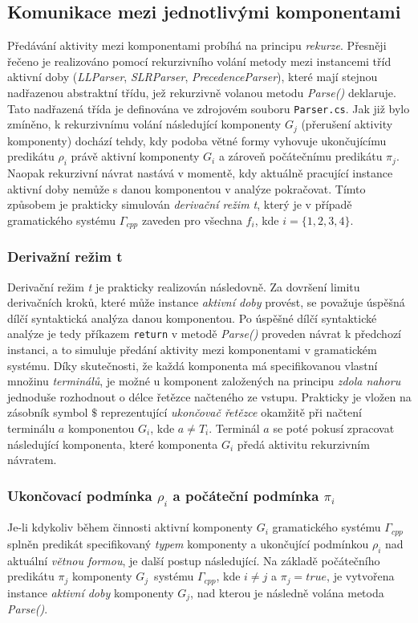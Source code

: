 \subsection*{Komunikace mezi jednotlivými komponentami}
Předávání aktivity mezi komponentami probíhá na principu \emph{rekurze}. Přesněji řečeno je realizováno pomocí rekurzivního volání metody mezi instancemi
tříd aktivní doby (\emph{LLParser}, \emph{SLRParser}, \emph{PrecedenceParser}), které mají stejnou nadřazenou abstraktní třídu, jež rekurzivně volanou metodu \emph{Parse()}
deklaruje. Tato nadřazená třída je definována ve zdrojovém souboru \verb|Parser.cs|. Jak již bylo zmíněno, k rekurzivnímu volání následující komponenty $G_j$
(přerušení aktivity komponenty) dochází tehdy, kdy podoba větné formy vyhovuje ukončujícímu predikátu $\rho_i$ právě aktivní komponenty $G_i$ a zároveň
počátečnímu predikátu $\pi_j$. Naopak rekurzivní návrat nastává v momentě, kdy aktuálně pracující instance aktivní doby nemůže s danou
komponentou v analýze pokračovat. Tímto způsobem je prakticky simulován \emph{derivační režim t}, který je v případě gramatického systému $\Gamma_{cpp}$
zaveden pro všechna $f_i$, kde $i = \{1, 2, 3, 4\}$.

\subsubsection*{Derivažní režim t}
Derivační režim \emph{t} je prakticky realizován následovně. Za dovršení limitu derivačních kroků, které může instance \emph{aktivní doby} provést, se
považuje úspěšná dílčí syntaktická analýza danou komponentou. Po úspěšné dílčí syntaktické analýze je tedy příkazem \verb|return| v metodě \emph{Parse()}
proveden návrat k předchozí instanci, a to simuluje předání aktivity mezi komponentami v gramatickém systému. Díky skutečnosti, že každá komponenta
má specifikovanou vlastní množinu \emph{terminálů}, je možné u komponent založených na principu \emph{zdola nahoru} jednoduše rozhodnout o délce řetězce
načteného ze vstupu. Prakticky je vložen na zásobník symbol $\$$ reprezentující \emph{ukončovač řetězce} okamžitě při načtení
terminálu $a$ komponentou $G_i$, kde $a \neq T_i$.
Terminál $a$ se poté pokusí zpracovat následující komponenta, které komponenta $G_i$ předá aktivitu rekurzivním návratem.

\subsubsection*{Ukončovací podmínka $\rho_i$ a počáteční podmínka $\pi_i$}
Je-li kdykoliv během činnosti aktivní komponenty $G_i$ gramatického systému $\Gamma_{cpp}$ splněn predikát specifikovaný \emph{typem} komponenty
a ukončující podmínkou $\rho_i$ nad aktuální \emph{větnou formou}, je další postup následující. Na základě počátečního predikátu $\pi_j$ komponenty $G_j$~systému
$\Gamma_{cpp}$, kde $i \neq j$ a $\pi_j = true$, je vytvořena instance \emph{aktivní doby} komponenty $G_j$, nad kterou je následně volána
metoda \emph{Parse()}.

